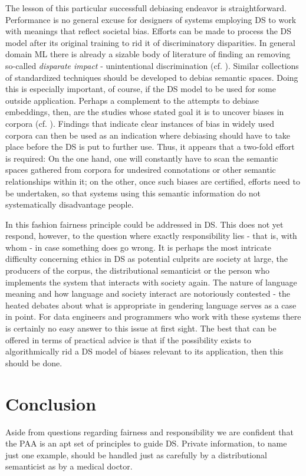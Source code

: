 \documentclass{article}
\begin{document}
The lesson of this particular successfull debiasing endeavor is straightforward. Performance is no general excuse for designers of systems employing DS to work with meanings that reflect societal bias. Efforts can be made to process the DS model after its original training to rid it of discriminatory disparities. In general domain ML there is already a sizable body of literature of finding an removing so-called \emph{disparate impact} - unintentional discrimination (cf. \cite{feldman2015certifying} \cite{dwork2012fairness}). 
Similar collections of standardized techniques should be developed to debias semantic spaces. Doing this is especially important, of course, if the DS model to be used for some outside application. 
Perhaps a complement to the attempts to debiase embeddings, then, are the studies whose stated goal it is to uncover biases in corpora (cf. \cite{wagner2015s} \cite{herbelot2012distributional}). Findings that indicate clear instances of bias in widely used corpora can then be used as an indication where  debiasing should have to take place before the DS is put to further use.
Thus, it appears that a two-fold effort is required: On the one hand, one will constantly have to scan the semantic spaces gathered from corpora for undesired connotations or other semantic relationships within it; on the other, once such biases are certified, efforts need to be undertaken, so that systems using this semantic information do not systematically disadvantage people.

In this fashion fairness principle could be addressed in DS. This does not yet respond, however, to the question where exactly responsibility lies - that is, with whom - in case something does go wrong.
It is perhaps the most intricate difficulty concerning ethics in DS as potential culprits are society at large, the producers of the corpus, the distributional semanticist or the person who implements the system that interacts with society again. 
The nature of language meaning and how language and society interact are notoriously contested - the heated debates about what is appropriate in gendering language serves as a case in point. For data engineers and programmers who work with these systems there is certainly no easy answer to this issue at first sight.
The best that can be offered in terms of practical advice is that if the possibility exists to algorithmically rid a DS model of biases relevant to its application, then this should be done.
\section{Conclusion}\hypertarget{sec5}{}
Aside from questions regarding fairness and responsibility we are confident that the PAA is an apt set of principles to guide DS. Private information, to name just one example, should be handled just as carefully by a distributional semanticist as by a medical doctor.
\end{document}
